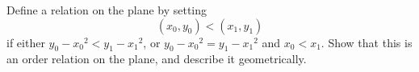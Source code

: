 \documentclass[../main.tex]{subfiles}
\begin{document}
\problem{}\label{s3p6}

Define a relation on the plane by setting \[({x_0},{y_0})<({x_1},{y_1})\] if
either \({y_0}-{{x_0}^2}<{y_1}-{{x_1}^2}\), or
\({y_0}-{{x_0}^2}={y_1}-{{x_1}^2}\) and \({x_0}<{x_1}\). Show that this is an
order relation on the plane, and describe it geometrically.

\todo{}
\end{document}
